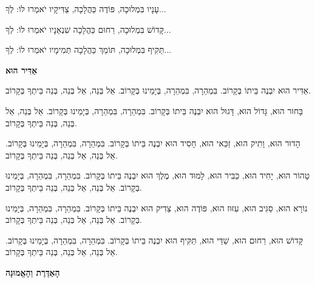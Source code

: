 עָנָיו בִּמְלוּכָה, פּוֹדֶה כַּהֲלָכָה, צַדִּיקָיו יֹאמְרוּ לוֹ: 
\hfill
לְךָ...

קָּדוֹשׁ בִּמְלוּכָה, רַחוּם כַּהֲלָכָה שִׁנְאַנָיו יֹאמְרוּ לוֹ: 
\hfill
לְךָ...

תַּקִיף בִּמְלוּכָה, תּוֹמֵךְ כַּהֲלָכָה תְּמִימָיו יֹאמְרוּ לוֹ: 
\hfill
לְךָ...

\break

\begin{center}
{\large \bfseries \textcolor{light-gray}{
אַדִּיר הוּא
}}
\end{center}

אַדִּיר הוּא יִבְנֶה בֵּיתוֹ בְּקָרוֹב. בִּמְהֵרָה, בִּמְהֵרָה, בְּיָמֵינוּ בְּקָרוֹב. אֵל בְּנֵה, אֵל בְּנֵה, בְּנֵה בֵּיתְךָ בְּקָרוֹב.

\vspace{1em}

בָּחוּר הוּא, גָּדוֹל הוּא, דָּגוּל הוּא יִבְנֶה בֵּיתוֹ בְּקָרוֹב. בִּמְהֵרָה, בִּמְהֵרָה, בְּיָמֵינוּ בְּקָרוֹב. אֵל בְּנֵה, אֵל בְּנֵה, בְּנֵה בֵּיתְךָ בְּקָרוֹב.

\vspace{1em}

הָדוּר הוּא, וָתִיק הוּא, זַכַּאי הוּא, חָסִיד הוּא יִבְנֶה בֵּיתוֹ בְּקָרוֹב. בִּמְהֵרָה, בִּמְהֵרָה, בְּיָמֵינוּ בְּקָרוֹב. אֵל בְּנֵה, אֵל בְּנֵה, בְּנֵה בֵּיתְךָ בְּקָרוֹב.

\vspace{1em}

טָהוֹר הוּא, יָחִיד הוּא, כַּבִּיר הוּא, לָמוּד הוּא, מֶלֶךְ הוּא יִבְנֶה בֵּיתוֹ בְּקָרוֹב. בִּמְהֵרָה, בִּמְהֵרָה, בְּיָמֵינוּ בְּקָרוֹב. אֵל בְּנֵה, אֵל בְּנֵה, בְּנֵה בֵּיתְךָ בְּקָרוֹב.

\vspace{1em}

נוֹרָא הוּא, סַגִּיב הוּא, עִזּוּז הוּא, פּוֹדֶה הוּא, צַדִיק הוּא יִבְנֶה בֵּיתוֹ בְּקָרוֹב. בִּמְהֵרָה, בִּמְהֵרָה, בְּיָמֵינוּ בְּקָרוֹב. אֵל בְּנֵה, אֵל בְּנֵה, בְּנֵה בֵּיתְךָ בְּקָרוֹב.

\vspace{1em}

קָּדוֹשׁ הוּא, רַחוּם הוּא, שַׁדַּי הוּא, תַּקִּיף הוּא יִבְנֶה בֵּיתוֹ בְּקָרוֹב. בִּמְהֵרָה, בִּמְהֵרָה, בְּיָמֵינוּ בְּקָרוֹב. אֵל בְּנֵה, אֵל בְּנֵה, בְּנֵה בֵּיתְךָ בְּקָרוֹב.

\vfill

\begin{center}
{\large \bfseries \textcolor{light-gray}{
הָאַדֶּרֶת וְהָאֱמוּנָה
}}
\end{center}

